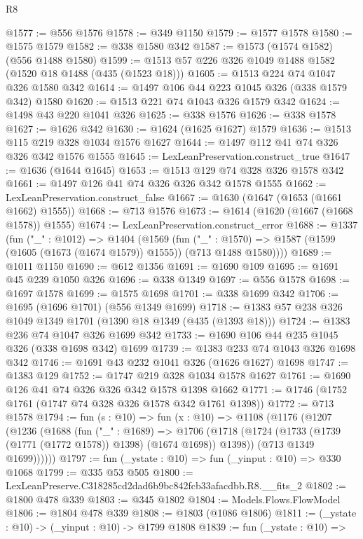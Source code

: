 \begin{lexlean}{R8}
\begin{coremodule}
@1577 := @556 @1576
@1578 := @349 @1150
@1579 := @1577 @1578
@1580 := @1575 @1579
@1582 := @338 @1580 @342
@1587 := @1573 (@1574 @1582) (@556 @1488 @1580)
@1599 := @1513 @57 @226 @326 @1049 @1488 @1582 (@1520 @18 @1488 (@435 (@1523 @18)))
@1605 := @1513 @224 @74 @1047 @326 @1580 @342
@1614 := @1497 @106 @44 @223 @1045 @326 (@338 @1579 @342) @1580
@1620 := @1513 @221 @74 @1043 @326 @1579 @342
@1624 := @1498 @43 @220 @1041 @326
@1625 := @338 @1576
@1626 := @338 @1578
@1627 := @1626 @342
@1630 := @1624 (@1625 @1627) @1579
@1636 := @1513 @115 @219 @328 @1034 @1576 @1627
@1644 := @1497 @112 @41 @74 @326 @326 @342 @1576 @1555
@1645 := LexLeanPreservation.construct_true
@1647 := @1636 (@1644 @1645)
@1653 := @1513 @129 @74 @328 @326 @1578 @342
@1661 := @1497 @126 @41 @74 @326 @326 @342 @1578 @1555
@1662 := LexLeanPreservation.construct_false
@1667 := @1630 (@1647 (@1653 (@1661 @1662) @1555))
@1668 := @713 @1576
@1673 := @1614 (@1620 (@1667 (@1668 @1578)) @1555)
@1674 := LexLeanPreservation.construct_error
@1688 := @1337
    (fun ("_" : @1012) =>
    @1404
      (@1569
        (fun ("_" : @1570) =>
        @1587 (@1599 (@1605 (@1673 (@1674 @1579)) @1555)) (@713 @1488 @1580))))
@1689 := @1011 @1150
@1690 := @612 @1356
@1691 := @1690 @109
@1695 := @1691 @45 @239 @1050 @326
@1696 := @338 @1349
@1697 := @556 @1578
@1698 := @1697 @1578
@1699 := @1575 @1698
@1701 := @338 @1699 @342
@1706 := @1695 (@1696 @1701) (@556 @1349 @1699)
@1718 := @1383 @57 @238 @326 @1049 @1349 @1701 (@1390 @18 @1349 (@435 (@1393 @18)))
@1724 := @1383 @236 @74 @1047 @326 @1699 @342
@1733 := @1690 @106 @44 @235 @1045 @326 (@338 @1698 @342) @1699
@1739 := @1383 @233 @74 @1043 @326 @1698 @342
@1746 := @1691 @43 @232 @1041 @326 (@1626 @1627) @1698
@1747 := @1383 @129
@1752 := @1747 @219 @328 @1034 @1578 @1627
@1761 := @1690 @126 @41 @74 @326 @326 @342 @1578 @1398 @1662
@1771 := @1746 (@1752 @1761 (@1747 @74 @328 @326 @1578 @342 @1761 @1398))
@1772 := @713 @1578
@1794 := fun (s : @10) =>
  fun (x : @10) =>
  @1108
    (@1176
      (@1207
        (@1236
          (@1688
            (fun ("_" : @1689) =>
            @1706
              (@1718 (@1724 (@1733 (@1739 (@1771 (@1772 @1578)) @1398) (@1674 @1698)) @1398))
              (@713 @1349 @1699))))))
@1797 := fun (_ystate : @10) => fun (_yinput : @10) => @330 @1068
@1799 := @335 @53 @505
@1800 := LexLeanPreserve.C318285cd2dad6b9bc842fcb33afacdbb.R8.__fits_2
@1802 := @1800 @478 @339
@1803 := @345 @1802
@1804 := Models.Flows.FlowModel
@1806 := @1804 @478 @339
@1808 := @1803 (@1086 @1806)
@1811 := (_ystate : @10) -> (_yinput : @10) -> @1799 @1808
@1839 := fun (_ystate : @10) =>

\end{coremodule}
\end{lexlean}
